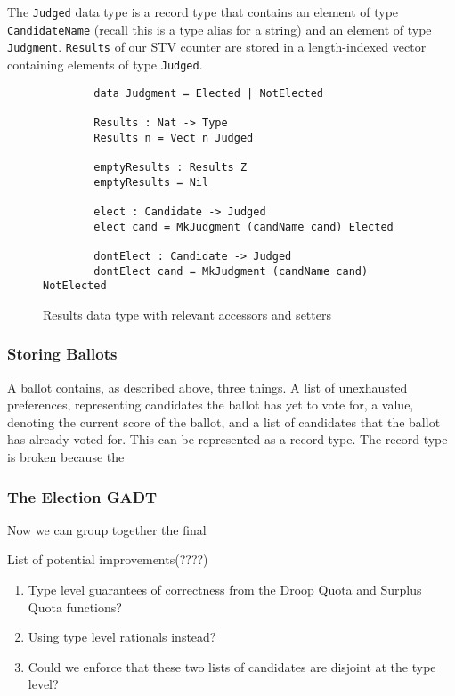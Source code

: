 The \texttt{Judged} data type is a record type that contains an element of type
\texttt{CandidateName} (recall this is a type alias for a string) and an element
of type \texttt{Judgment}. \texttt{Results} of our STV counter are stored in a
length-indexed vector containing elements of type \texttt{Judged}.

\begin{figure}[ht!!!!!!!!!!!!!!]
    \caption{Results data type with relevant accessors and setters}
    \label{judgments_code}
    \begin{lstlisting}
        data Judgment = Elected | NotElected

        Results : Nat -> Type
        Results n = Vect n Judged
        
        emptyResults : Results Z
        emptyResults = Nil

        elect : Candidate -> Judged
        elect cand = MkJudgment (candName cand) Elected

        dontElect : Candidate -> Judged
        dontElect cand = MkJudgment (candName cand) NotElected
    \end{lstlisting}
\end{figure}

\subsubsection{Storing Ballots}

A ballot contains, as described above, three things. A list of unexhausted
preferences, representing candidates the ballot has yet to vote for, a value,
denoting the current score of the ballot, and a list of candidates that the
ballot has already voted for. This can be represented as a record type. The
record type is broken because the 

\subsubsection{The Election GADT}

Now we can group together the final 

List of potential improvements(????)
\begin{enumerate}
    \item Type level guarantees of correctness from the Droop Quota and Surplus Quota functions?
    \item Using type level rationals instead?
    \item Could we enforce that these two lists of candidates are disjoint at the type level?
\end{enumerate}